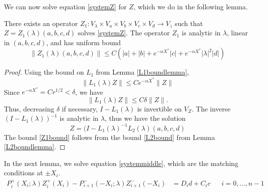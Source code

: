 \documentclass[thesis.tex]{subfiles}
\begin{document}
We can now solve equation \eqref{systemZ} for $Z$, which we do in the following lemma.

\begin{lemma}\label{Zinv0}
There exists an operator $Z_1: V_\lambda \times V_a \times V_b \times V_c \times V_d \rightarrow V_z$ such that $Z = Z_1(\lambda)(a,b,c,d)$ solves \eqref{systemZ}. The operator $Z_1$ is analytic in $\lambda$, linear in $(a,b,c,d)$, and has uniform bound
\begin{equation}\label{Z1bound}
\| Z_1(\lambda)(a,b,c,d) \| \leq C\left(|a| + |b| + e^{-\alpha X^*} |c| + e^{-\alpha X^*}|\lambda|^2|d|\right)
\end{equation}
\begin{proof}
Using the bound on $L_1$ from Lemma \ref{L1boundlemma}, 
\[
\|L_1(\lambda)Z\| \leq C e^{-\alpha X^*}\|Z\|
\]
Since $e^{-\alpha X^*} = C r^{1/2} < \delta$, we have
\[
\|L_1(\lambda)Z\| \leq C \delta \|Z\|.
\]
Thus, decreasing $\delta$ if necessary, $I - L_1(\lambda)$ is invertible on $V_Z$. The inverse $(I - L_1(\lambda))^{-1}$ is analytic in $\lambda$, thus we have the solution
\begin{equation}\label{L1L2eqinv}
Z = (I - L_1(\lambda)^{-1}L_2(\lambda)(a,b,c,d)
\end{equation}
The bound \eqref{Z1bound} follows from the bound \eqref{L2bound} from Lemma \ref{L2boundlemma}.
\end{proof}
\end{lemma}

In the next lemma, we solve equation \eqref{systemmiddle}, which are the matching conditions at $\pm X_i$.
\begin{align*}
P_i^+(X_i; \lambda) Z_i^+(X_i) - P_{i+1}^-(-X_i; \lambda) Z_{i+1}^-(-X_i) &= D_i d + C_i c && i = 0, \dots, n-1
\end{align*}
\end{document}
